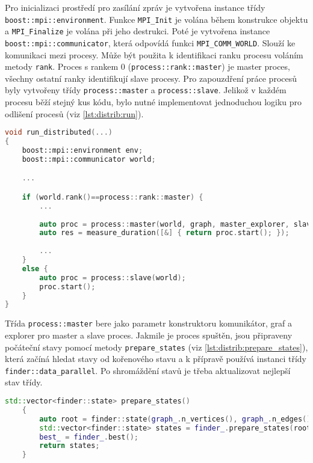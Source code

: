 Pro inicializaci prostředí pro zasílání zpráv je vytvořena instance třídy \texttt{boost::mpi::environment}.
Funkce \texttt{MPI\_Init} je volána během konstrukce objektu a \texttt{MPI\_Finalize} je volána při jeho destrukci.
Poté je vytvořena instance \texttt{boost::mpi::communicator}, která odpovídá funkci \texttt{MPI\_COMM\_WORLD}.
Slouží ke komunikaci mezi procesy.
Může být použita k identifikaci ranku procesu voláním metody \texttt{rank}.
Proces s rankem 0 (\texttt{process::rank::master}) je master proces, všechny ostatní ranky identifikují slave procesy.
Pro zapouzdření práce procesů byly vytvořeny třídy \texttt{process::master} a \texttt{process::slave}.
Jelikož v každém procesu běží stejný kus kódu, bylo nutné implementovat jednoduchou logiku pro odlišení procesů (viz \ref{lst:distrib:run}).

\begin{lstlisting}[language=C++, label={lst:distrib:run}, caption={Rozdělení procesů}]
void run_distributed(...)
{
    boost::mpi::environment env;
    boost::mpi::communicator world;

    ...

    if (world.rank()==process::rank::master) {
        ...
        
        auto proc = process::master(world, graph, master_explorer, slave_explorer);
        auto res = measure_duration([&] { return proc.start(); });
        
        ...
    }
    else {
        auto proc = process::slave(world);
        proc.start();
    }
}
\end{lstlisting}

Třída \texttt{process::master} bere jako parametr konstruktoru komunikátor, graf a explorer pro master a slave proces.
Jakmile je proces spuštěn, jsou připraveny počáteční stavy pomocí metody \texttt{prepare\_states} (viz \ref{lst:distrib:prepare_states}), která začíná hledat stavy od kořenového stavu a k přípravě používá instanci třídy \texttt{finder::data\_parallel}.
Po shromáždění stavů je třeba aktualizovat nejlepší stav třídy.

\begin{lstlisting}[language=C++, label={lst:distrib:prepare_states}, caption={Metoda pro přípravu počátečních stavů}]
    std::vector<finder::state> prepare_states()
    {
        auto root = finder::state(graph_.n_vertices(), graph_.n_edges());
        std::vector<finder::state> states = finder_.prepare_states(root);
        best_ = finder_.best();
        return states;
    }
\end{lstlisting}


